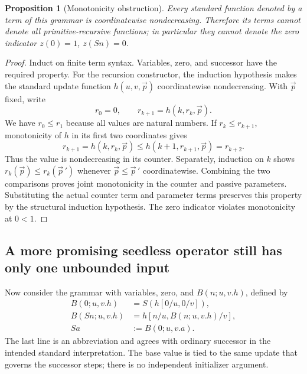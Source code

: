 \documentclass[11pt,letterpaper]{article}
\newtheorem{proposition}[theorem]{Proposition}
\theoremstyle{definition}\newtheorem{definition}[theorem]{Definition}
\theoremstyle{remark}\newtheorem{remark}[theorem]{Remark}
\begin{document}
\begin{proposition}[Monotonicity obstruction]
\label{seedless:monotonicity}
Every standard function denoted by a term of this grammar is
coordinatewise nondecreasing. Therefore its terms cannot denote all
primitive-recursive functions; in particular they cannot denote the
zero indicator $z(0)=1$, $z(Sn)=0$.
\end{proposition}
\begin{proof}
Induct on finite term syntax. Variables, zero, and successor have the
required property. For the recursion constructor, the induction hypothesis
makes the standard update function $h(u,v,\vec p)$ coordinatewise
nondecreasing. With $\vec p$ fixed, write
\[
 r_0=0,\qquad r_{k+1}=h(k,r_k,\vec p).
\]
We have $r_0\le r_1$ because all values are natural numbers. If
$r_k\le r_{k+1}$, monotonicity of $h$ in its first two coordinates gives
\[
 r_{k+1}=h(k,r_k,\vec p)
 \le h(k+1,r_{k+1},\vec p)=r_{k+2}.
\]
Thus the value is nondecreasing in its counter. Separately, induction on
$k$ shows $r_k(\vec p)\le r_k(\vec p\,')$ whenever
$\vec p\le\vec p\,'$ coordinatewise. Combining the two comparisons
proves joint monotonicity in the counter and passive parameters.
Substituting the actual counter term and parameter terms preserves this
property by the structural induction hypothesis. The zero indicator
violates monotonicity at $0<1$.
\end{proof}

\subsection{A more promising seedless operator still has only one unbounded input}

Now consider the grammar with variables, zero, and
$B(n;u,v.h)$, defined by
\[
 \begin{aligned}
 B(0;u,v.h)&=S(h[0/u,0/v]),\\
 B(Sn;u,v.h)&=h[n/u,B(n;u,v.h)/v],\\
 Sa&:=B(0;u,v.a).
 \end{aligned}
 \tag{Successor at the base}\label{seedless:B}
\]
The last line is an abbreviation and agrees with ordinary successor in
the intended standard interpretation. The base value is tied to the
same update that governs the successor steps; there is no independent
initializer argument.
\end{document}
